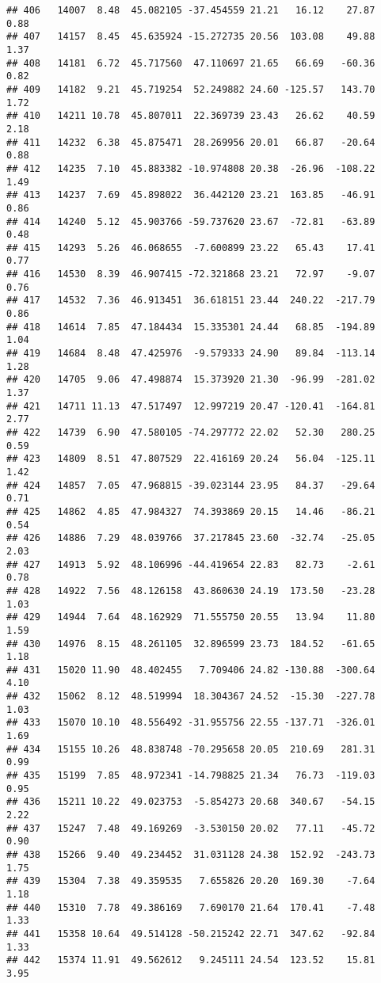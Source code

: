\documentclass[]{article}
\begin{document}
\begin{verbatim}
## 406   14007  8.48  45.082105 -37.454559 21.21   16.12    27.87  0.88
## 407   14157  8.45  45.635924 -15.272735 20.56  103.08    49.88  1.37
## 408   14181  6.72  45.717560  47.110697 21.65   66.69   -60.36  0.82
## 409   14182  9.21  45.719254  52.249882 24.60 -125.57   143.70  1.72
## 410   14211 10.78  45.807011  22.369739 23.43   26.62    40.59  2.18
## 411   14232  6.38  45.875471  28.269956 20.01   66.87   -20.64  0.88
## 412   14235  7.10  45.883382 -10.974808 20.38  -26.96  -108.22  1.49
## 413   14237  7.69  45.898022  36.442120 23.21  163.85   -46.91  0.86
## 414   14240  5.12  45.903766 -59.737620 23.67  -72.81   -63.89  0.48
## 415   14293  5.26  46.068655  -7.600899 23.22   65.43    17.41  0.77
## 416   14530  8.39  46.907415 -72.321868 23.21   72.97    -9.07  0.76
## 417   14532  7.36  46.913451  36.618151 23.44  240.22  -217.79  0.86
## 418   14614  7.85  47.184434  15.335301 24.44   68.85  -194.89  1.04
## 419   14684  8.48  47.425976  -9.579333 24.90   89.84  -113.14  1.28
## 420   14705  9.06  47.498874  15.373920 21.30  -96.99  -281.02  1.37
## 421   14711 11.13  47.517497  12.997219 20.47 -120.41  -164.81  2.77
## 422   14739  6.90  47.580105 -74.297772 22.02   52.30   280.25  0.59
## 423   14809  8.51  47.807529  22.416169 20.24   56.04  -125.11  1.42
## 424   14857  7.05  47.968815 -39.023144 23.95   84.37   -29.64  0.71
## 425   14862  4.85  47.984327  74.393869 20.15   14.46   -86.21  0.54
## 426   14886  7.29  48.039766  37.217845 23.60  -32.74   -25.05  2.03
## 427   14913  5.92  48.106996 -44.419654 22.83   82.73    -2.61  0.78
## 428   14922  7.56  48.126158  43.860630 24.19  173.50   -23.28  1.03
## 429   14944  7.64  48.162929  71.555750 20.55   13.94    11.80  1.59
## 430   14976  8.15  48.261105  32.896599 23.73  184.52   -61.65  1.18
## 431   15020 11.90  48.402455   7.709406 24.82 -130.88  -300.64  4.10
## 432   15062  8.12  48.519994  18.304367 24.52  -15.30  -227.78  1.03
## 433   15070 10.10  48.556492 -31.955756 22.55 -137.71  -326.01  1.69
## 434   15155 10.26  48.838748 -70.295658 20.05  210.69   281.31  0.99
## 435   15199  7.85  48.972341 -14.798825 21.34   76.73  -119.03  0.95
## 436   15211 10.22  49.023753  -5.854273 20.68  340.67   -54.15  2.22
## 437   15247  7.48  49.169269  -3.530150 20.02   77.11   -45.72  0.90
## 438   15266  9.40  49.234452  31.031128 24.38  152.92  -243.73  1.75
## 439   15304  7.38  49.359535   7.655826 20.20  169.30    -7.64  1.18
## 440   15310  7.78  49.386169   7.690170 21.64  170.41    -7.48  1.33
## 441   15358 10.64  49.514128 -50.215242 22.71  347.62   -92.84  1.33
## 442   15374 11.91  49.562612   9.245111 24.54  123.52    15.81  3.95

\end{verbatim}
\end{document}
